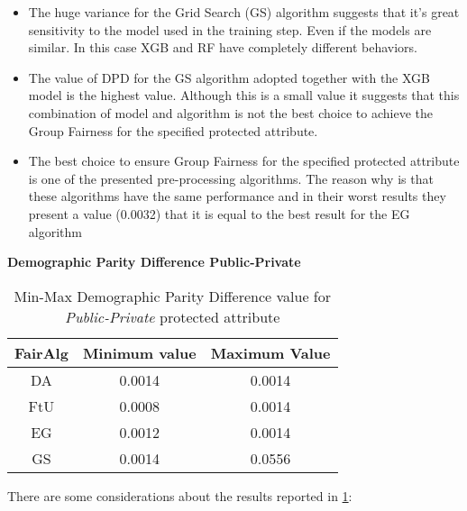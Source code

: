 \begin{itemize}
    \item The huge variance for the Grid Search (GS) algorithm suggests that it's great sensitivity to the model used in the training step. Even if the models are similar. In this case XGB and RF have completely different behaviors.

    \item The value of DPD for the GS algorithm adopted together with the XGB model is the highest value. Although this is a small value it suggests that this combination of model and algorithm is not the best choice to achieve the Group Fairness for the specified protected attribute.

    \item The best choice to ensure Group Fairness for the specified protected attribute is one of the presented pre-processing algorithms. The reason why is that these algorithms have the same performance and in their worst results they present a value (0.0032) that it is equal to the best result for the EG algorithm
\end{itemize}

\newpage
\textbf{Demographic Parity Difference Public-Private}
\begin{table}
    \centering
    \begin{tabular}{|c|c|c|}
        \hline
        \textbf{FairAlg} & \textbf{Minimum value} & \textbf{Maximum Value} \\
        \hline
        DA & 0.0014 & 0.0014 \\
        \hline
        FtU & 0.0008 & 0.0014 \\
        \hline
        EG & 0.0012 & 0.0014 \\
        \hline
        GS & 0.0014 & 0.0556 \\
        \hline
    \end{tabular}
    \caption{Min-Max Demographic Parity Difference value for \emph{Public-Private} protected attribute}
    \label{tab:pp_dpd}
\end{table}

There are some considerations about the results reported in \cref{tab:pp_dpd}:


